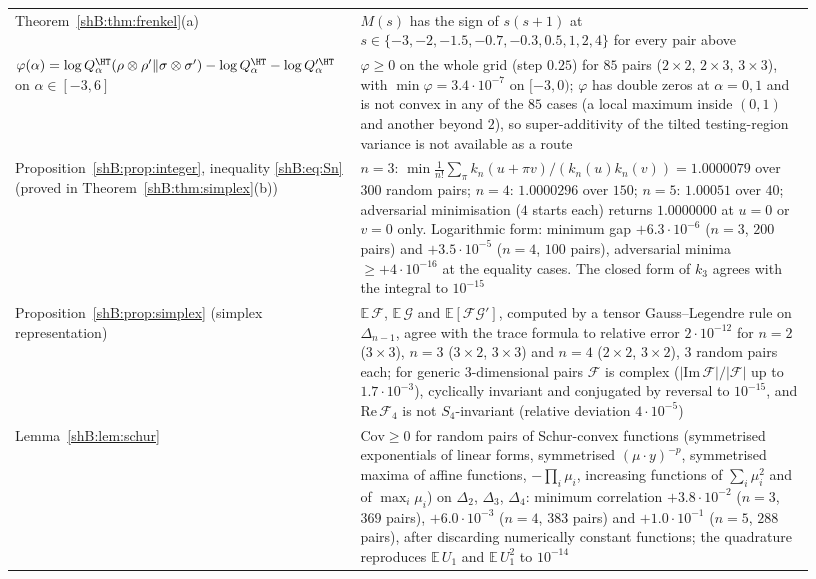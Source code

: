 {\begin{longtable}{>{\raggedright\arraybackslash}p{0.38\linewidth}>{\raggedright\arraybackslash}p{0.55\linewidth}}
Theorem~\ref{shB:thm:frenkel}(a) & $M(s)$ has the sign of $s(s+1)$ at $s\in\{-3,-2,-1.5,-0.7,-0.3,0.5,1,2,4\}$ for every pair above\\
$\varphi(\alpha)=\log Q^\HT_\alpha(\rho\otimes\rho'\|\sigma\otimes\sigma')-\log Q^\HT_\alpha-\log Q'^\HT_\alpha$ on $\alpha\in[-3,6]$ & $\varphi\ge0$ on the whole grid (step $0.25$) for $85$ pairs ($2\times2$, $2\times3$, $3\times3$), with $\min\varphi=3.4\cdot10^{-7}$ on $[-3,0)$; $\varphi$ has double zeros at $\alpha=0,1$ and is not convex in any of the $85$ cases (a local maximum inside $(0,1)$ and another beyond $2$), so super-additivity of the tilted testing-region variance is not available as a route\\
Proposition~\ref{shB:prop:integer}, inequality \eqref{shB:eq:Sn} (proved in Theorem~\ref{shB:thm:simplex}(b)) & $n=3$: $\min\frac1{n!}\sum_\pi k_n(u+\pi v)/(k_n(u)k_n(v))=1.0000079$ over $300$ random pairs; $n=4$: $1.0000296$ over $150$; $n=5$: $1.00051$ over $40$; adversarial minimisation ($4$ starts each) returns $1.0000000$ at $u=0$ or $v=0$ only. Logarithmic form: minimum gap $+6.3\cdot10^{-6}$ ($n=3$, $200$ pairs) and $+3.5\cdot10^{-5}$ ($n=4$, $100$ pairs), adversarial minima $\ge+4\cdot10^{-16}$ at the equality cases. The closed form of $k_3$ agrees with the integral to $10^{-15}$\\
Proposition~\ref{shB:prop:simplex} (simplex representation) & $\mathbb E\,\mathcal F$, $\mathbb E\,\mathcal G$ and $\mathbb E[\mathcal F\mathcal G']$, computed by a tensor Gauss--Legendre rule on $\Delta_{n-1}$, agree with the trace formula to relative error $2\cdot10^{-12}$ for $n=2$ ($3\times3$), $n=3$ ($3\times2$, $3\times3$) and $n=4$ ($2\times2$, $3\times2$), $3$ random pairs each; for generic $3$-dimensional pairs $\mathcal F$ is complex ($|\mathrm{Im}\,\mathcal F|/|\mathcal F|$ up to $1.7\cdot10^{-3}$), cyclically invariant and conjugated by reversal to $10^{-15}$, and $\mathrm{Re}\,\mathcal F_4$ is not $S_4$-invariant (relative deviation $4\cdot10^{-5}$)\\
Lemma~\ref{shB:lem:schur} & $\mathrm{Cov}\ge0$ for random pairs of Schur-convex functions (symmetrised exponentials of linear forms, symmetrised $(\mu\cdot y)^{-p}$, symmetrised maxima of affine functions, $-\prod_i\mu_i$, increasing functions of $\sum_i\mu_i^2$ and of $\max_i\mu_i$) on $\Delta_2$, $\Delta_3$, $\Delta_4$: minimum correlation $+3.8\cdot10^{-2}$ ($n=3$, $369$ pairs), $+6.0\cdot10^{-3}$ ($n=4$, $383$ pairs) and $+1.0\cdot10^{-1}$ ($n=5$, $288$ pairs), after discarding numerically constant functions; the quadrature reproduces $\mathbb E\,U_1$ and $\mathbb E\,U_1^2$ to $10^{-14}$\\

\end{longtable}}
